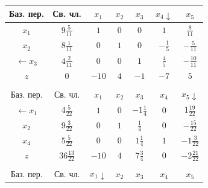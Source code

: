 \documentclass[a4paper,14pt]{extarticle}
\begin{document}
\begin{center}
    \begin{tabular}{|c|c|c|c|c|c|c|}
        \hline
        Баз. пер.        & Св. чл.           & $x_1$             & $x_2$ & $x_3$            & $x_4 \downarrow$ & $x_5$             \\
        \hline
        $x_1$            & $9\frac{5}{11}$   & $1$               & $0$   & $0$              & $1$              & $\frac{8}{11}$    \\
        \hline
        $x_2$            & $8\frac{1}{11}$   & $0$               & $1$   & $0$              & $-\frac{1}{5}$   & $-\frac{5}{11}$   \\
        \hline
        $\leftarrow x_3$ & $4\frac{2}{11}$   & $0$               & $0$   & $1$              & $\frac{4}{5}$    & $-\frac{10}{11}$  \\
        \hline
        $z$              & $0$               & $-10$             & $4$   & $-1$             & $-7$             & $5$               \\
        \hline
        \multicolumn{7}{c}{}                                                                                                       \\
        \hline
        Баз. пер.        & Св. чл.           & $x_1$             & $x_2$ & $x_3$            & $x_4 $           & $x_5 \downarrow$  \\
        \hline
        $\leftarrow x_1$ & $4\frac{5}{22}$   & $1$               & $0$   & $-1\frac{1}{4}$  & $0$              & $1\frac{19}{22}$  \\
        \hline
        $x_2$            & $9\frac{3}{22}$   & $0$               & $1$   & $\frac{1}{4}$    & $0$              & $-\frac{15}{22}$  \\
        \hline
        $x_4$            & $5\frac{5}{22}$   & $0$               & $0$   & $1\frac{1}{4}$   & $1$              & $-1\frac{3}{22}$  \\
        \hline
        $z$              & $36\frac{13}{22}$ & $-10$             & $4$   & $7\frac{3}{4}$   & $0$              & $-2\frac{21}{22}$ \\
        \hline
        \multicolumn{7}{c}{}                                                                                                       \\
        \hline
        Баз. пер.        & Св. чл.           & $x_1 \downarrow$  & $x_2$ & $x_3$            & $x_4 $           & $x_5$             \\
        \hline

\end{tabular}
\end{center}
\end{document}
